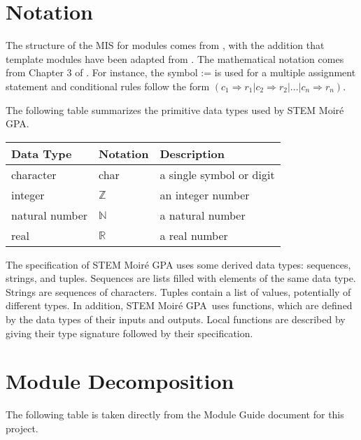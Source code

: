 \documentclass[12pt, titlepage]{article}
\newcommand{\progname}{STEM Moir{\'e} GPA}
\begin{document}
\section{Notation}


The structure of the MIS for modules comes from \cite{HoffmanAndStrooper1995},
with the addition that template modules have been adapted from
\cite{GhezziEtAl2003}.  The mathematical notation comes from Chapter 3 of
\cite{HoffmanAndStrooper1995}.  For instance, the symbol := is used for a
multiple assignment statement and conditional rules follow the form $(c_1
\Rightarrow r_1 | c_2 \Rightarrow r_2 | ... | c_n \Rightarrow r_n )$.

The following table summarizes the primitive data types used by \progname. 

\begin{center}
\renewcommand{\arraystretch}{1.2}
\noindent 
\begin{tabular}{l l p{7.5cm}} 
\toprule 
\textbf{Data Type} & \textbf{Notation} & \textbf{Description}\\ 
\midrule
character & char & a single symbol or digit\\
integer & $\mathbb{Z}$ & an integer number \\
natural number & $\mathbb{N}$ & a natural number \\
real & $\mathbb{R}$ & a real number \\
\bottomrule
\end{tabular} 
\end{center}

\noindent
The specification of \progname{} uses some derived data types: sequences, strings, and
tuples. Sequences are lists filled with elements of the same data type. Strings
are sequences of characters. Tuples contain a list of values, potentially of
different types. In addition, \progname \ uses functions, which
are defined by the data types of their inputs and outputs. Local functions are
described by giving their type signature followed by their specification.

\section{Module Decomposition}

The following table is taken directly from the Module Guide document for this project.
\end{document}
